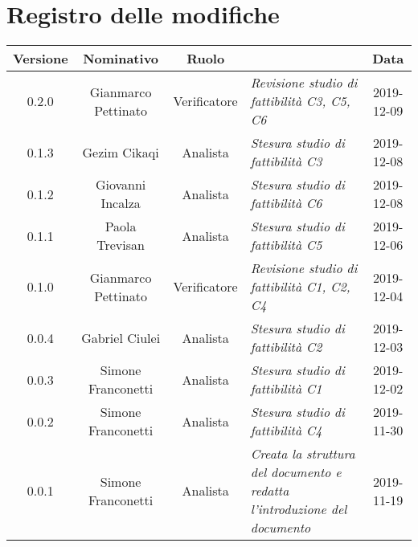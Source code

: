 \section*{Registro delle modifiche}
\renewcommand{\arraystretch}{1.8}

  \begin{longtable}{|c|c|c|p{3.8cm}|c|}
    \hline

    \rowcolor{header}
    \textbf{Versione} & \textbf{Nominativo} & \textbf{Ruolo} & \centering{\textbf{Descrizione}} & \textbf{Data}\\

    \hline
	0.2.0 & Gianmarco Pettinato & Verificatore & \small{\textit{Revisione studio di fattibilità C3, C5, C6}} & 2019-12-09\\
    
    0.1.3 & Gezim Cikaqi & Analista & \small{\textit{Stesura studio di fattibilità C3}} & 2019-12-08\\
    
    0.1.2 & Giovanni Incalza & Analista & \small{\textit{Stesura studio di fattibilità C6}} & 2019-12-08\\
    
    0.1.1 & Paola Trevisan & Analista & \small{\textit{Stesura studio di fattibilità C5}} & 2019-12-06\\
    
    0.1.0 & Gianmarco Pettinato & Verificatore & \small{\textit{Revisione studio di fattibilità C1, C2, C4}} & 2019-12-04\\
    
    0.0.4 & Gabriel Ciulei & Analista & \small{\textit{Stesura studio di fattibilità C2}} & 2019-12-03\\
    
    0.0.3 & Simone Franconetti & Analista & \small{\textit{Stesura studio di fattibilità C1}} & 2019-12-02\\
    
    0.0.2 & Simone Franconetti & Analista & \small{\textit{Stesura studio di fattibilità C4}} & 2019-11-30\\
    
    0.0.1 & Simone Franconetti & Analista & \small{\textit{Creata la struttura del documento e redatta l'introduzione del documento}} & 2019-11-19\\

    \hline
  \end{longtable}
